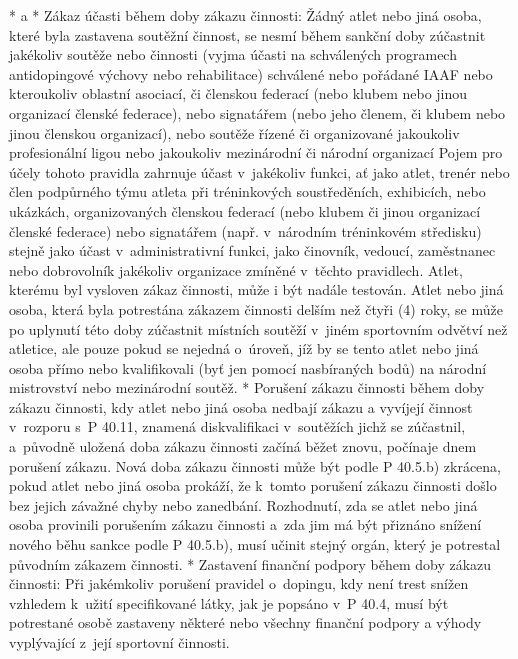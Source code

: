 * \begitems \style a
  * Zákaz účasti během doby zákazu činnosti: Žádný atlet nebo jiná osoba, které byla zastavena soutěžní činnost, se nesmí během sankční doby zúčastnit jakékoliv soutěže nebo činnosti (vyjma účasti na schválených programech antidopingové výchovy nebo rehabilitace) schválené nebo pořádané IAAF nebo kteroukoliv oblastní asociací, či členskou federací (nebo klubem nebo jinou organizací členské federace), nebo signatářem (nebo jeho členem, či klubem nebo jinou členskou organizací), nebo soutěže řízené či organizované jakoukoliv profesionální ligou nebo jakoukoliv mezinárodní či národní organizací Pojem  pro účely tohoto pravidla zahrnuje účast v~jakékoliv funkci, ať jako atlet, trenér nebo člen podpůrného týmu atleta při tréninkových soustředěních, exhibicích, nebo ukázkách, organizovaných členskou federací (nebo klubem či jinou organizací členské federace) nebo signatářem (např. v~národním tréninkovém středisku) stejně jako účast v~administrativní funkci, jako činovník, vedoucí, zaměstnanec nebo dobrovolník jakékoliv organizace zmíněné v~těchto pravidlech. Atlet, kterému byl vysloven zákaz činnosti, může i být nadále testován. Atlet nebo jiná osoba, která byla potrestána zákazem činnosti delším než čtyři (4) roky, se může po uplynutí této doby zúčastnit místních soutěží v~jiném sportovním odvětví než atletice, ale pouze pokud se nejedná o~úroveň, jíž by se tento atlet nebo jiná osoba přímo nebo kvalifikovali (byť jen pomocí nasbíraných bodů) na národní mistrovství nebo mezinárodní soutěž.
  * Porušení zákazu činnosti během doby zákazu činnosti, kdy atlet nebo jiná osoba nedbají zákazu a vyvíjejí činnost v~rozporu s~P 40.11, znamená diskvalifikaci v~soutěžích jichž se zúčastnil, a~původně uložená doba zákazu činnosti začíná běžet znovu, počínaje dnem porušení zákazu. Nová doba zákazu činnosti může být podle P 40.5.b) zkrácena, pokud atlet nebo jiná osoba prokáží, že k~tomto porušení zákazu činnosti došlo bez jejich závažné chyby nebo zanedbání. Rozhodnutí, zda se atlet nebo jiná osoba provinili porušením zákazu činnosti a~zda jim má být přiznáno snížení nového běhu sankce podle P 40.5.b), musí učinit stejný orgán, který je potrestal původním zákazem činnosti.
  * Zastavení finanční podpory během doby zákazu činnosti: Při jakémkoliv porušení pravidel o~dopingu, kdy není trest snížen vzhledem k~užití specifikované látky, jak je popsáno v~P 40.4, musí být potrestané osobě zastaveny některé nebo všechny finanční podpory a výhody vyplývající z~její sportovní činnosti.
  \enditems

